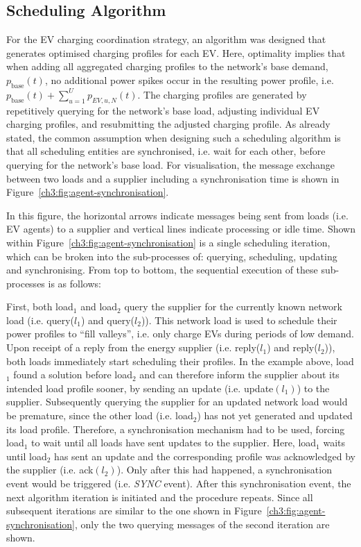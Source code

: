 \subsection{Scheduling Algorithm}
\label{ch3:subsec:scheduling-algorithm}

For the EV charging coordination strategy, an algorithm was designed that generates optimised charging profiles for each EV.
Here, optimality implies that when adding all aggregated charging profiles to the network's base demand, $p_\text{base}(t)$, no additional power spikes occur in the resulting power profile, i.e. $p_\text{base}(t) + \sum_{u=1}^U p_{EV,u,N}(t)$.
The charging profiles are generated by repetitively querying for the network's base load, adjusting individual EV charging profiles, and resubmitting the adjusted charging profile.
As already stated, the common assumption when designing such a scheduling algorithm is that all scheduling entities are synchronised, i.e. wait for each other, before querying for the network's base load.
For visualisation, the message exchange between two loads and a supplier including a synchronisation time is shown in Figure~\ref{ch3:fig:agent-synchronisation}.



In this figure, the horizontal arrows indicate messages being sent from loads (i.e. EV agents) to a supplier and vertical lines indicate processing or idle time.
Shown within Figure~\ref{ch3:fig:agent-synchronisation} is a single scheduling iteration, which can be broken into the sub-processes of: querying, scheduling, updating and synchronising.
From top to bottom, the sequential execution of these sub-processes is as follows:

First, both load$_1$ and load$_2$ query the supplier for the currently known network load (i.e. query($l_1$) and query($l_2$)).
This network load is used to schedule their power profiles to ``fill valleys'', i.e. only charge EVs during periods of low demand.
Upon receipt of a reply from the energy supplier (i.e. reply($l_1$) and reply($l_2$)), both loads immediately start scheduling their profiles.
In the example above, load$_1$ found a solution before load$_2$ and can therefore inform the supplier about its intended load profile sooner, by sending an update (i.e. update$(l_1)$) to the supplier.
Subsequently querying the supplier for an updated network load would be premature, since the other load (i.e. load$_2$) has not yet generated and updated its load profile.
Therefore, a synchronisation mechanism had to be used, forcing load$_1$ to wait until all loads have sent updates to the supplier.
Here, load$_1$ waits until load$_2$ has sent an update and the corresponding profile was acknowledged by the supplier (i.e. ack$(l_2)$).
Only after this had happened, a synchronisation event would be triggered (i.e. \textit{SYNC} event).
After this synchronisation event, the next algorithm iteration is initiated and the procedure repeats.
Since all subsequent iterations are similar to the one shown in Figure~\ref{ch3:fig:agent-synchronisation}, only the two querying messages of the  second iteration are shown.

